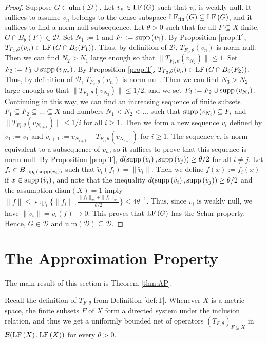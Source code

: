 \documentclass[12pt]{amsart}
\theoremstyle{definition}
\numberwithin{equation}{section}
\def \D {\mathcal{D}}
\def \B {\mathcal{B}}
\def \sbs {\subseteq}
\newcommand{\diam}[1]{\mathrm{diam}\left( #1 \right)}
\newcommand{\ulm}[1]{\mathrm{ulm}\left(#1\right)}
\begin{document}
\begin{proof}
Suppose $G \in \ulm{\D}$. Let $v_n \in \LF{G}$ such that $v_n$ is weakly null. It suffices to assume $v_n$ belongs to the dense subspace $\LFf{G} \sbs \LF{G}$, and it suffices to find a norm null subsequence. Let $\theta > 0$ such that for all $F \sbs X$ finite, $G \cap B_\theta(F) \in \D$. Set $N_1 := 1$ and $F_1 := \supp{v_1}$. By Proposition \ref{prop:T}, $T_{F_1,\theta}(v_n) \in \LF{G \cap B_\theta(F_1)}$. Thus, by definition of $\D$, $T_{F_1,\theta}(v_n)$ is norm null. Then we can find $N_2 > N_1$ large enough so that $\|T_{F_1,\theta}(v_{N_2})\| \leq 1$. Set $F_2 := F_1 \cup \supp{v_{N_2}}$.  By Proposition \ref{prop:T}, $T_{F_2,\theta}(v_n) \in \LF{G \cap B_\theta(F_2)}$. Thus, by definition of $\D$, $T_{F_2,\theta}(v_n)$ is norm null. Then we can find $N_3 > N_2$ large enough so that $\|T_{F_2,\theta}(v_{N_3})\| \leq 1/2$, and we set $F_3 := F_2 \cup \supp{v_{N_3}}$. Continuing in this way, we can find an increasing sequence of finite subsets $F_1 \sbs F_2 \sbs \dots \sbs X$ and numbers $N_1 < N_2 < \dots$ such that $\supp{v_{N_i}} \sbs F_i$ and $\|T_{F_i,\theta}(v_{N_{i+1}})\| \leq 1/i$ for all $i \geq 1$. Then we form a new sequence $\tilde{v}_i$ defined by $\tilde{v}_1 := v_1$ and $\tilde{v}_{i+1} := v_{N_{i+1}} - T_{F_i,\theta}(v_{N_{i+1}})$ for $i \geq 1$. The sequence $\tilde{v}_i$ is norm-equivalent to a subsequence of $v_n$, so it suffices to prove that this sequence is norm null. By Proposition \ref{prop:T}, $d(\supp{\tilde{v}_{i}},\supp{\tilde{v}_{j}}) \geq \theta/2$ for all $i \neq j$. Let $f_i \in B_{\Lip{\supp{\tilde{v}_i}}}$ such that $\tilde{v}_i(f_i) = \|\tilde{v}_i\|$. Then we define $f(x) := f_i(x)$ if $x \in \supp{\tilde{v}_i}$, and note that the inequality $d(\supp{\tilde{v}_{i}},\supp{\tilde{v}_{j}}) \geq \theta/2$ and the assumption $\diam{X} = 1$ imply $\|f\| \leq \sup_i \{\|f_i\|,\frac{\|f_i\|_\infty+\|f_i\|_\infty}{\theta/2}\} \leq 4\theta^{-1}$. Thus, since $\tilde{v}_i$ is weakly null, we have $\|\tilde{v}_i\| = \tilde{v}_i(f) \to 0$. This proves that $\LF{G}$ has the Schur property. Hence, $G \in \D$ and $\ulm{\D} \sbs \D$.
\end{proof}

\section{The Approximation Property}
The main result of this section is Theorem \ref{thm:AP}.

Recall the definition of $T_{F,\theta}$ from Definition \ref{def:T}. Whenever $X$ is a metric space, the finite subsets $F$ of $X$ form a directed system under the inclusion relation, and thus we get a uniformly bounded net of operators $(T_{F,\theta})_{F \sbs X}$ in $\B(\LF{X},\LF{X})$ for every $\theta > 0$.
\end{document}
